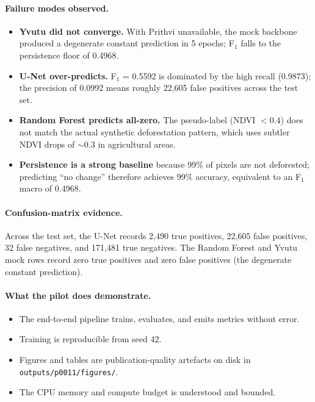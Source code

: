 \paragraph{Failure modes observed.}
\begin{itemize}
    \item \textbf{Yvutu did not converge.} With Prithvi unavailable, the
    mock backbone produced a degenerate constant prediction in 5
    epochs; F$_1$ falls to the persistence floor of 0.4968.
    \item \textbf{U-Net over-predicts.} F$_1$ = 0.5592 is dominated by
    the high recall (0.9873); the precision of 0.0992 means roughly
    22{,}605 false positives across the test set.
    \item \textbf{Random Forest predicts all-zero.} The pseudo-label
    (NDVI $< 0.4$) does not match the actual synthetic deforestation
    pattern, which uses subtler NDVI drops of $\sim$0.3 in agricultural
    areas.
    \item \textbf{Persistence is a strong baseline} because 99\% of
    pixels are not deforested; predicting ``no change'' therefore
    achieves 99\% accuracy, equivalent to an F$_1$ macro of 0.4968.
\end{itemize}

\paragraph{Confusion-matrix evidence.} Across the test set, the U-Net
records 2{,}490 true positives, 22{,}605 false positives, 32 false
negatives, and 171{,}481 true negatives. The Random Forest and Yvutu
mock rows record zero true positives and zero false positives
(the degenerate constant prediction).

\paragraph{What the pilot does demonstrate.}
\begin{itemize}
    \item The end-to-end pipeline trains, evaluates, and emits metrics
    without error.
    \item Training is reproducible from seed 42.
    \item Figures and tables are publication-quality artefacts on disk
    in \texttt{outputs/p0011/figures/}.
    \item The CPU memory and compute budget is understood and bounded.
\end{itemize}

